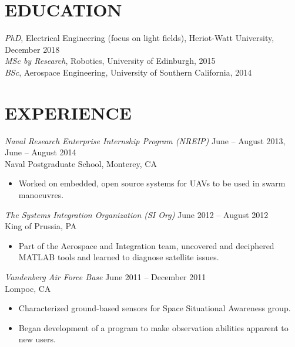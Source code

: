 \documentclass[10pt]{res} %
\begin{document}
\begin{resume}

\section{EDUCATION} 

{\sl PhD}, Electrical Engineering (focus on light fields), Heriot-Watt University, December 2018\\
\emph{MSc by Research}, Robotics, University of Edinburgh, 2015\\ 
\emph{BSc}, Aerospace Engineering, University of Southern California, 2014 


\section{EXPERIENCE}

{\sl Naval Research Enterprise Internship Program (NREIP)} \hfill June -- August 2013, June -- August 2014 \\
Naval Postgraduate School, Monterey, CA
\begin{itemize} \itemsep -2pt %
\item Worked on embedded, open source systems for UAVs to be used in swarm manoeuvres.  
\end{itemize}

{\sl The Systems Integration Organization (SI Org)}
\hfill June 2012 -- August 2012 \\
King of Prussia, PA 
\begin{itemize} \itemsep -2pt %
\item Part of the Aerospace and Integration team, uncovered and deciphered MATLAB tools and learned to diagnose satellite issues.
\end{itemize} 

{\sl Vandenberg Air Force Base} 
\hfill June 2011 -- December 2011 \\ 
Lompoc, CA
\begin{itemize}\itemsep -2pt
\item Characterized ground-based sensors for Space Situational Awareness group.
\item Began development of a program to make observation abilities apparent to new users.
\end{itemize}


\end{resume}
\end{document}
